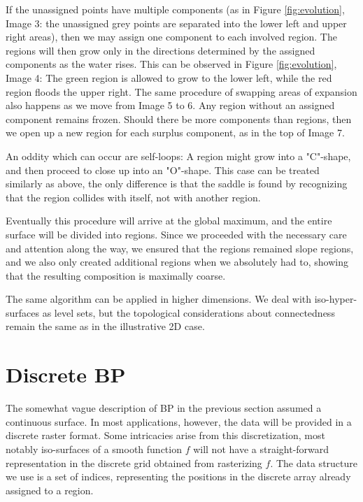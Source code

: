 \documentclass[11pt,twoside,twocolumn,a4paper]{article}
\theoremstyle{plain}
\theoremstyle{definition}
\begin{document}
If the unassigned points have multiple components (as in Figure \ref{fig:evolution}, Image 3: the unassigned grey points are separated into the lower left and upper right areas), then we may assign one component to each involved region.
The regions will then grow only in the directions determined by the assigned components as the water rises.
This can be observed in Figure \ref{fig:evolution}, Image 4: The green region is allowed to grow to the lower left, while the red region floods the upper right.
The same procedure of swapping areas of expansion also happens as we move from Image 5 to 6.
Any region without an assigned component remains frozen.
Should there be more components than regions, then we open up a new region for each surplus component, as in the top of Image 7.

An oddity which can occur are self-loops: A region might grow into a "C"-shape, and then proceed to close up into an "O"-shape.
This case can be treated similarly as above, the only difference is that the saddle is found by recognizing that the region collides with itself, not with another region.

Eventually this procedure will arrive at the global maximum, and the entire surface will be divided into regions.
Since we proceeded with the necessary care and attention along the way, we ensured that the regions remained slope regions, and we also only created additional regions when we absolutely had to, showing that the resulting composition is maximally coarse.

The same algorithm can be applied in higher dimensions.
We deal with iso-hyper-surfaces as level sets, but the topological considerations about connectedness remain the same as in the illustrative 2D case.

\section{Discrete BP}
\label{sec:details}

The somewhat vague description of BP in the previous section assumed a continuous surface.
In most applications, however, the data will be provided in a discrete raster format.
Some intricacies arise from this discretization, most notably iso-surfaces of a smooth function $f$ will not have a straight-forward representation in the discrete grid obtained from rasterizing $f$.
The data structure we use is a set of indices, representing the positions in the discrete array already assigned to a region.
\end{document}
